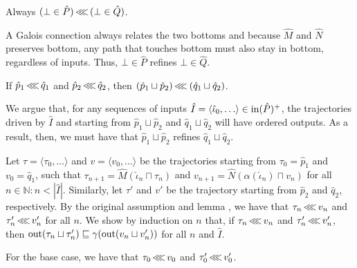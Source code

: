 

\begin{lemma}
Always $(\bot \in \hat P) \operatorname{\lll} \, (\bot \in \hat Q)$.
\end{lemma}

A Galois connection always relates the two bottoms and because $\hat M$ and $\hat N$ preserves bottom, any path that touches bottom must also stay in bottom, regardless of inputs. Thus, $\bot \in \hat P$ refines $\bot \in \hat Q$.

\begin{lemma}
If $\hat p_{1} \operatorname{\lll} \hat q_{1}$ and $\hat p_{2} \operatorname{\lll} \hat q_{2}$, then $(\hat p_{1} \sqcup \hat p_{2}) \operatorname{\lll} \: (\hat q_{1} \sqcup \hat q_{2})$.
\end{lemma}

We argue that, for any sequences of inputs $\hat I = \langle \hat \iota_{0}, \ldots \rangle \in \operatorname{in}(\hat P)^{+}$, the trajectories driven by $\hat I$ and starting from $\hat p_{1} \sqcup \hat p_{2}$ and $\hat q_{1} \sqcup \hat q_{2}$ will have ordered outputs. As a result, then, we must have that $\hat p_{1} \sqcup \hat p_{2}$ refines $\hat q_{1} \sqcup \hat q_{2}$.


Let $\tau = \langle \tau_{0}, \ldots \rangle$ and $v = \langle v_{0}, \ldots \rangle$ be the trajectories starting from $\tau_{0} = \hat p_{1}$ and $v_{0} = \hat q_{1}$, such that $\tau_{n+1} = \hat M(\hat \iota_{n} \sqcap \tau_{n})$ and $v_{n+1} = \hat N(\alpha(\hat \iota_{n}) \sqcap v_{n})$ for all $n \in \mathbb{N} : n < | \hat I |$. Similarly, let $\tau'$ and $v'$ be the trajectory starting from $\hat p_{2}$ and $\hat q_{2}$, respectively. By the original assumption and lemma , we have that $\tau_{n} \operatorname{\lll} v_{n}$ and $\tau_{n}' \operatorname{\lll} v_{n}'$ for all $n$. We show by induction on $n$ that, if $\tau_{n} \operatorname{\lll} v_{n}$ and $\tau_{n}' \operatorname{\lll} v_{n}'$, then $\operatorname{out}(\tau_{n} \sqcup \tau_{n}') \sqsubseteq \gamma(\operatorname{out}(v_{n} \sqcup v_{n}'))$ for all $n$ and $\hat I$.

For the base case, we have that $\tau_{0} \operatorname{\lll} v_{0}$ and $\tau_{0}' \operatorname{\lll} v_{0}'$.


